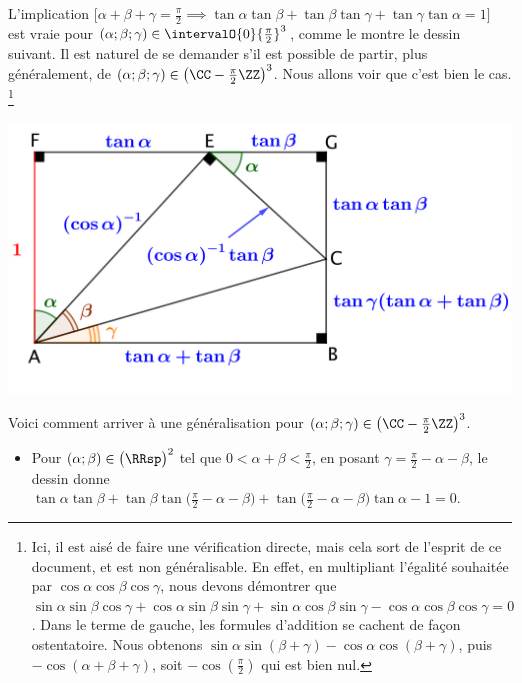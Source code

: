 

\newpage
\begin{example}
    L'implication
    $\big[
        \alpha + \beta + \gamma = \frac{\pi}{2}
        \implies
          \tan \alpha \tan \beta
        + \tan \beta  \tan \gamma
        + \tan \gamma \tan \alpha
        = 1
    \big]$
    est vraie pour 
    $(\alpha ; \beta ; \gamma) \in \intervalO{0}{\frac{\pi}{2}}^3$,
    comme le montre le dessin suivant.
    Il est naturel de se demander s'il est possible de partir, plus généralement, de
    $(\alpha ; \beta ; \gamma) \in \big( \CC - \frac{\pi}{2} \ZZ \big)^3$.
    Nous allons voir que c'est bien le cas.
    \footnote{
    	Ici, il est aisé de faire une vérification directe, mais cela sort de l'esprit de ce document, et est non généralisable.
		En effet,
		en multipliant l'égalité souhaitée par $\cos \alpha \cos \beta \cos \gamma$, nous devons démontrer que
		$ \sin \alpha \sin \beta \cos \gamma
        + \cos \alpha \sin \beta \sin \gamma
        + \sin \alpha \cos \beta \sin \gamma
        - \cos \alpha \cos \beta \cos \gamma
        = 0$.
        Dans le terme de gauche, les formules d'addition se cachent de façon ostentatoire.
        Nous obtenons
		$ \sin \alpha \sin(\beta + \gamma)
        - \cos \alpha \cos(\beta + \gamma)$,
        puis
		$ - \cos (\alpha + \beta + \gamma)$,
        soit
		$- \cos (\frac{\pi}{2})$
		qui est bien nul.
    }
    
    \begin{center}
    	\includegraphics[scale=.75]{sum-tan-prod.png}
    \end{center}
    
    Voici comment arriver à une généralisation pour
    $(\alpha ; \beta ; \gamma) \in \big( \CC - \frac{\pi}{2} \ZZ \big)^3$.
    \begin{itemize}
    	\item Pour $(\alpha ; \beta) \in \big( \RRsp \big)^2$ tel que $0 < \alpha + \beta < \frac{\pi}{2}$,
		en posant $\gamma = \frac{\pi}{2} - \alpha - \beta$,
		le dessin donne
        $
            \tan \alpha \tan \beta
            + \tan \beta  \tan \big( \frac{\pi}{2} - \alpha - \beta \big)
            + \tan \big( \frac{\pi}{2} - \alpha - \beta \big) \tan \alpha
            - 1
            = 0
        $.
        


\end{itemize}
\end{example}
